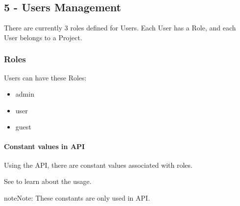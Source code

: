 \documentclass[a4paper,12pt,english]{sphinxmanual}
\begin{document}
\subsection{5 - Users Management}
\label{\detokenize{tutorials/guided_tour:users-management}}
There are currently 3 roles defined for Users.
Each User has a Role, and each User belongs to a Project.


\subsubsection{Roles}
\label{\detokenize{tutorials/guided_tour:roles}}
Users can have these Roles:
\begin{itemize}
\item {} 
admin

\item {} 
user

\item {} 
guest

\end{itemize}


\paragraph{Constant values in API}
\label{\detokenize{tutorials/guided_tour:constant-values-in-api}}
Using the API, there are constant values associated with roles.

See  to learn about the usage.

\begin{sphinxadmonition}{note}{Note:}
These constants are only used in API.
\end{sphinxadmonition}
\end{document}
